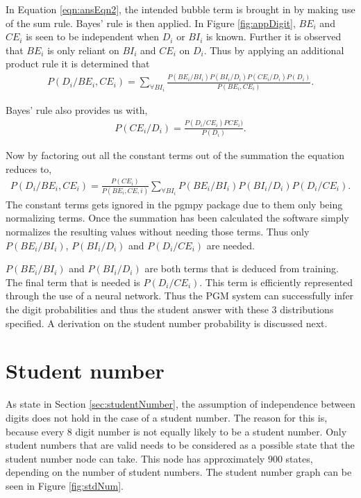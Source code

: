 In Equation \ref{eqn:ansEqn2}, the intended bubble term is brought in by making use of the sum rule. Bayes' rule is then applied. In Figure \ref{fig:appDigit}, $BE_i$ and $CE_i$ is seen to be independent when $D_i$ or $BI_i$ is known. Further it is observed that $BE_i$ is only reliant on $BI_i$ and $CE_i$ on $D_i$. Thus by applying an additional product rule it is determined that
\begin{align}
  P(D_i/BE_i,CE_i) =  \sum_{\forall BI_i}^{}\frac{P(BE_i/BI_i)P(BI_i/D_i)P(CE_i/D_i)P(D_i)}{P(BE_i,CE_i)}.
\label{eqn:ansEqn3}
\end{align}

Bayes' rule also provides us with,
\begin{align}
  P(CE_i/D_i)	=  \frac{P(D_i/CE_i)PCE_i)}{P(D_i)}.
\label{eqn:ansEqn4}
\end{align}

Now by factoring out all the constant terms out of the summation the equation reduces to,
\begin{align}
  P(D_i/BE_i,CE_i) =  \frac{P(CE_i)}{P(BE_i,CE,i)}\sum_{\forall BI_i}^{}P(BE_i/BI_i)P(BI_i/D_i)P(D_i/CE_i).
\label{eqn:ansEqn5}
\end{align}
The constant terms gets ignored in the pgmpy package due to them only being normalizing terms. Once the summation has been calculated the software simply normalizes the resulting values without needing those terms. Thus only $P(BE_i/BI_i)$, $P(BI_i/D_i)$ and $P(D_i/CE_i)$ are needed.

$P(BE_i/BI_i)$ and  $P(BI_i/D_i)$ are both terms that is deduced from training. The final term that is needed is $P(D_i/CE_i)$. This term is efficiently represented through the use of a neural network. Thus the PGM system can successfully infer the digit probabilities and thus the student answer with these 3 distributions specified. A derivation on the student number probability is discussed next.

\section{Student number}
As state in Section \ref{sec:studentNumber}, the assumption of independence between digits does not hold in the case of a student number. The reason for this is, because every 8 digit number is not equally likely to be a student number. Only student numbers that are valid needs to be considered as a possible state that the student number node can take. This node has approximately $900$ states, depending on the number of student numbers. The student number graph can be seen in Figure \ref{fig:stdNum}. 

